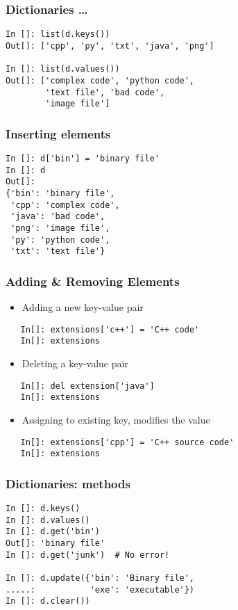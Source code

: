 \documentclass[14pt,compress]{beamer}
\begin{document}
\begin{frame}[fragile]
  \frametitle{Dictionaries \ldots}
  \begin{small}
    \begin{lstlisting}
In []: list(d.keys())
Out[]: ['cpp', 'py', 'txt', 'java', 'png']

In []: list(d.values())
Out[]: ['complex code', 'python code',
        'text file', 'bad code',
        'image file']
    \end{lstlisting}
  \end{small}
\end{frame}

\begin{frame}[fragile]
  \frametitle{Inserting elements}
  \begin{lstlisting}
In []: d['bin'] = 'binary file'
In []: d
Out[]:
{'bin': 'binary file',
 'cpp': 'complex code',
 'java': 'bad code',
 'png': 'image file',
 'py': 'python code',
 'txt': 'text file'}
  \end{lstlisting}
\end{frame}

\begin{frame}[fragile]
  \frametitle{Adding \& Removing Elements}
  \begin{itemize}
  \item Adding a new key-value pair
  \end{itemize}
  \begin{lstlisting}
   In[]: extensions['c++'] = 'C++ code'
   In[]: extensions
  \end{lstlisting}
  \begin{itemize}
  \item Deleting a key-value pair
  \end{itemize}
  \begin{lstlisting}
   In[]: del extension['java']
   In[]: extensions
  \end{lstlisting}
  \begin{itemize}
  \item Assigning to existing key, modifies the value
  \end{itemize}
  \begin{lstlisting}
   In[]: extensions['cpp'] = 'C++ source code'
   In[]: extensions
  \end{lstlisting}
\end{frame}

\begin{frame}[fragile]
  \frametitle{Dictionaries:  methods}
\begin{lstlisting}
In []: d.keys()
In []: d.values()
In []: d.get('bin')
Out[]: 'binary file'
In []: d.get('junk')  # No error!

In []: d.update({'bin': 'Binary file',
.....:           'exe': 'executable'})
In []: d.clear())
\end{lstlisting}
\end{frame}
\end{document}
